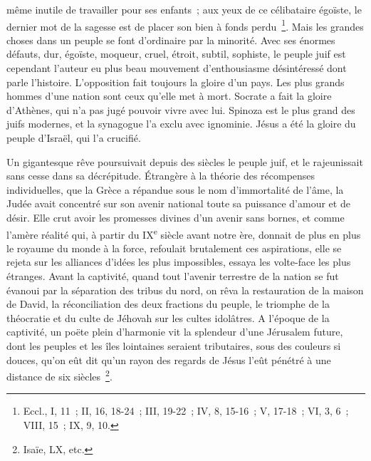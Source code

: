 \documentclass[french,twoside]{book} %
\begin{document}
même inutile de travailler pour ses enfants ; aux yeux de ce célibataire égoïste, le dernier mot de la sagesse est de placer son bien à fonds perdu \footnote{Eccl., I, 11 ; II, 16, 18-24 ; III, 19-22 ; IV, 8, 15-16 ; V, 17-18 ; VI, 3, 6 ; VIII, 15 ; IX, 9, 10.}. Mais les grandes choses dans un peuple se font d’ordinaire par la minorité. Avec ses énormes défauts, dur, égoïste, moqueur, cruel, étroit, subtil, sophiste, le peuple juif est cependant l’auteur eu plus beau mouvement d’enthousiasme désintéressé dont parle l’histoire. L’opposition fait toujours la gloire d’un pays. Les plus grands hommes d’une nation sont ceux qu’elle met à mort. Socrate a fait la gloire d’Athènes, qui n’a pas jugé pouvoir vivre avec lui. Spinoza est le plus grand des juifs modernes, et la synagogue l’a exclu avec ignominie. Jésus a été la gloire du peuple d’Israël, qui l’a crucifié.\par
Un gigantesque rêve poursuivait depuis des siècles le peuple juif, et le rajeunissait sans cesse dans sa décrépitude. Étrangère à la théorie des récompenses individuelles, que la Grèce a répandue sous le nom d’immortalité de l’âme, la Judée avait concentré sur son avenir national toute sa puissance d’amour et de désir. Elle crut avoir les promesses divines d’un avenir sans bornes, et comme l’amère réalité qui, à partir du IX\textsuperscript{e} siècle avant notre ère, donnait de plus en plus le royaume du monde à la force, refoulait brutalement ces aspirations, elle se rejeta sur les alliances d’idées les plus impossibles, essaya les volte-face les plus étranges. Avant la captivité, quand tout l’avenir terrestre de la nation se fut évanoui par la séparation des tribus du nord, on rêva la restauration de la maison de David, la réconciliation des deux fractions du peuple, le triomphe de la théocratie et du culte de Jéhovah sur les cultes idolâtres. A l’époque de la captivité, un poëte plein d’harmonie vit la splendeur d’une Jérusalem future, dont les peuples et les îles lointaines seraient tributaires, sous des couleurs si douces, qu’on eût dit qu’un rayon des regards de Jésus l’eût pénétré à une distance de six siècles \footnote{Isaïe, LX, etc.}.\par
\end{document}
